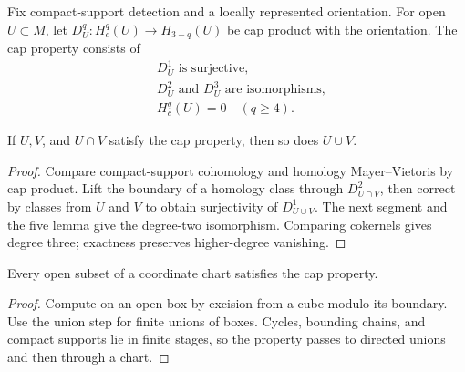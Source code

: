 \begin{definition}
\label{def:foundations-cap-property}
Fix compact-support detection and a locally represented orientation.
For open $U\subset M$, let $D_U^q:H_c^q(U)\to H_{3-q}(U)$ be
cap product with the orientation. The cap property consists of
\begin{equation}
\label{eq:foundations-cap-property}
\begin{aligned}
 &D_U^1\text{ is surjective},\\
 &D_U^2\text{ and }D_U^3\text{ are isomorphisms},\\
 &H_c^q(U)=0\quad(q\geq4).
\end{aligned}
\end{equation}
\end{definition}

\begin{lemma}
\label{lem:foundations-cap-union}
If $U,V$, and $U\cap V$ satisfy the cap property, then so does $U\cup V$.
\end{lemma}
\begin{proof}
Compare compact-support cohomology and homology Mayer--Vietoris by cap
product. Lift the boundary of a homology class through $D_{U\cap V}^2$,
then correct by classes from $U$ and $V$ to obtain surjectivity of
$D_{U\cup V}^1$. The next segment and the five lemma give the
degree-two isomorphism. Comparing cokernels gives degree three;
exactness preserves higher-degree vanishing.
\end{proof}

\begin{lemma}
\label{lem:foundations-chart-cap}
Every open subset of a coordinate chart satisfies the cap property.
\end{lemma}
\begin{proof}
Compute on an open box by excision from a cube modulo its boundary.
Use the union step for finite unions of boxes. Cycles, bounding chains,
and compact supports lie in finite stages, so the property passes to
directed unions and then through a chart.
\end{proof}

